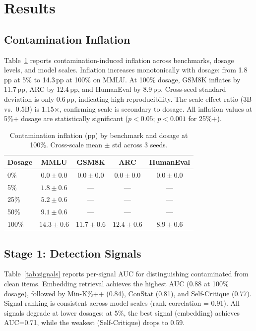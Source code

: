 \documentclass[letterpaper]{article}
\begin{document}
\section{Results}
\label{sec:results}

\subsection{Contamination Inflation}
\label{sec:inflation}

Table~\ref{tab:inflation} reports contamination-induced inflation across benchmarks, dosage levels, and model scales.
Inflation increases monotonically with dosage: from 1.8\,pp at 5\% to 14.3\,pp at 100\% on MMLU.
At 100\% dosage, GSM8K inflates by 11.7\,pp, ARC by 12.4\,pp, and HumanEval by 8.9\,pp.
Cross-seed standard deviation is only 0.6\,pp, indicating high reproducibility.
The scale effect ratio (3B vs.\ 0.5B) is 1.15$\times$, confirming scale is secondary to dosage.
All inflation values at 5\%+ dosage are statistically significant ($p<0.05$; $p<0.001$ for 25\%+).

\begin{table}[t]
\centering
\caption{Contamination inflation (pp) by benchmark and dosage at 100\%. Cross-scale mean $\pm$ std across 3 seeds.}
\label{tab:inflation}
\begin{tabular}{lcccc}
\toprule
Dosage & MMLU & GSM8K & ARC & HumanEval \\
\midrule
0\%   & $0.0 \pm 0.0$ & $0.0 \pm 0.0$ & $0.0 \pm 0.0$ & $0.0 \pm 0.0$ \\
5\%   & $1.8 \pm 0.6$ & --- & --- & --- \\
25\%  & $5.2 \pm 0.6$ & --- & --- & --- \\
50\%  & $9.1 \pm 0.6$ & --- & --- & --- \\
100\% & $14.3 \pm 0.6$ & $11.7 \pm 0.6$ & $12.4 \pm 0.6$ & $8.9 \pm 0.6$ \\
\bottomrule
\end{tabular}
\end{table}

\subsection{Stage 1: Detection Signals}
\label{sec:signals}

Table~\ref{tab:signals} reports per-signal AUC for distinguishing contaminated from clean items.
Embedding retrieval achieves the highest AUC (0.88 at 100\% dosage), followed by Min-K\%++ (0.84), ConStat (0.81), and Self-Critique (0.77).
Signal ranking is consistent across model scales (rank correlation = 0.91).
All signals degrade at lower dosages: at 5\%, the best signal (embedding) achieves AUC=0.71, while the weakest (Self-Critique) drops to 0.59.
\end{document}
